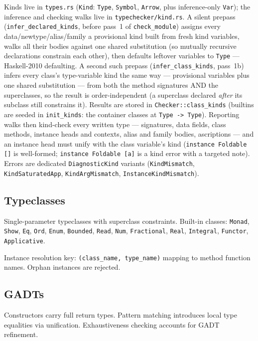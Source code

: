 \documentclass[11pt,a4paper]{article}
\begin{document}
Kinds live in \texttt{types.rs} (\texttt{Kind}: \texttt{Type},
\texttt{Symbol}, \texttt{Arrow}, plus inference-only \texttt{Var}); the
inference and checking walks live in \texttt{typechecker/kind.rs}.  A
silent prepass (\texttt{infer\_declared\_kinds}, before pass~1 of
\texttt{check\_module}) assigns every data/newtype/alias/family a
provisional kind built from fresh kind variables, walks all their
bodies against one shared substitution (so mutually recursive
declarations constrain each other), then defaults leftover variables to
\texttt{Type} --- Haskell-2010 defaulting.  A second such prepass
(\texttt{infer\_class\_kinds}, pass~1b) infers every class's
type-variable kind the same way --- provisional variables plus one
shared substitution --- from both the method signatures AND the
superclasses, so the result is order-independent (a superclass declared
\emph{after} its subclass still constrains it).  Results are stored in
\texttt{Checker::class\_kinds} (builtins are seeded in
\texttt{init\_kinds}: the container classes at \texttt{Type -> Type}).
Reporting walks then kind-check every written type --- signatures, data
fields, class methods, instance heads and contexts, alias and family
bodies, ascriptions --- and an instance head must unify with the class
variable's kind (\texttt{instance Foldable []} is well-formed;
\texttt{instance Foldable [a]} is a kind error with a targeted note).
Errors are dedicated \texttt{DiagnosticKind} variants
(\texttt{KindMismatch}, \texttt{KindSaturatedApp},
\texttt{KindArgMismatch}, \texttt{InstanceKindMismatch}).

\subsection{Typeclasses}

Single-parameter typeclasses with superclass constraints.  Built-in classes:
\texttt{Monad}, \texttt{Show}, \texttt{Eq}, \texttt{Ord}, \texttt{Enum},
\texttt{Bounded}, \texttt{Read}, \texttt{Num}, \texttt{Fractional},
\texttt{Real}, \texttt{Integral}, \texttt{Functor}, \texttt{Applicative}.

Instance resolution key: \texttt{(class\_name, type\_name)} mapping to method
function names.  Orphan instances are rejected.

\subsection{GADTs}

Constructors carry full return types.  Pattern matching introduces local type
equalities via unification.  Exhaustiveness checking accounts for GADT
refinement.
\end{document}
